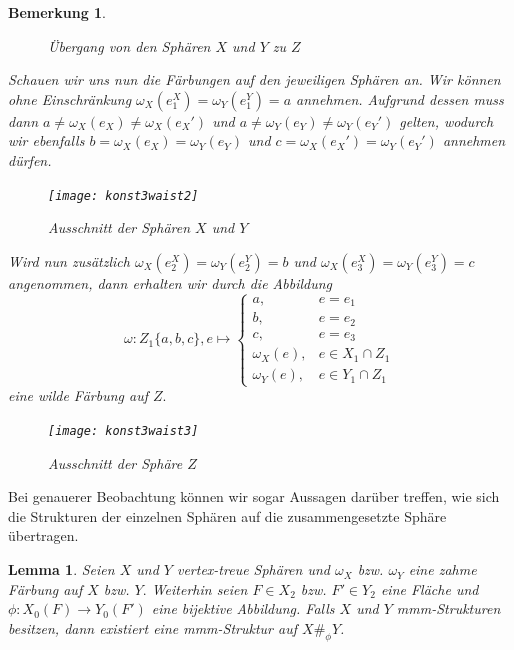 \documentclass[12pt,titlepage,twoside,cleardoublepage]{article}
\theoremstyle{nummermitklammern}
\newtheorem{lemma}[temp]{Lemma}
\newtheorem{bemerkung}[temp]{Bemerkung}
\newtheorem{lemma}[zahl]{Lemma}
\newtheorem{bemerkung}[zahl]{Bemerkung}
\numberwithin{equation}{section}
\begin{document}
\begin{bemerkung}
\begin{figure}[H]
\caption{Übergang von den Sphären $X$ und $Y$ zu $Z$}
\end{figure}   
Schauen wir uns nun die Färbungen auf den jeweiligen Sphären an. Wir können ohne Einschränkung $\omega_X(e_1^X)=\omega_Y(e_1^Y)=a$ annehmen. Aufgrund dessen muss dann $
a\neq \omega_X(e_X) \neq\omega_X(e_X')$
und $
a\neq \omega_Y(e_Y) \neq\omega_Y(e_Y')$
gelten, wodurch wir ebenfalls $
b= \omega_X(e_X) =\omega_Y(e_Y)$ und $
c= \omega_X(e_X') =\omega_Y(e_Y')$ annehmen dürfen.
\begin{figure}[H]
\begin{center}
\texttt{[image: konst3waist2]}
\end{center}
\caption{Ausschnitt der Sphären $X$ und $Y$}
\end{figure}
Wird nun zusätzlich $\omega_X(e_2^X)=\omega_Y(e_2^Y)=b$ und $\omega_X(e_3^X)=\omega_Y(e_3^Y)=c$ angenommen, dann erhalten wir durch die Abbildung 
\[
\omega: Z_1 \{a,b,c\},e\mapsto
 \begin{cases}
 a, &e=e_1\\
 b,& e=e_2 \\
 c, & e=e_3\\
 \omega_X(e), &e \in X_1\cap Z_1\\
 \omega_Y(e), & e\in Y_1 \cap Z_1
 \end{cases}
\]
eine wilde Färbung auf $Z.$
\begin{figure}[H]
\begin{center}
\texttt{[image: konst3waist3]}
\end{center}
\caption{Ausschnitt der Sphäre $Z$}
\end{figure}
\end{bemerkung}
Bei genauerer Beobachtung können wir sogar Aussagen darüber treffen, wie sich die Strukturen der einzelnen Sphären auf die zusammengesetzte Sphäre übertragen.
\begin{lemma}
Seien $X$ und $Y$ vertex-treue Sphären und $\omega_X$ bzw. $\omega_Y$ eine zahme Färbung auf $X$ bzw. $Y.$ Weiterhin seien $F\in X_2$ bzw. $F'\in Y_2$ eine Fläche und $\phi:X_0(F)\to Y_0(F')$ eine bijektive Abbildung. 
Falls $X$ und $Y$ mmm-Strukturen besitzen, dann existiert eine mmm-Struktur auf $X\#_{\phi}Y$.
\end{lemma}
\end{document}

